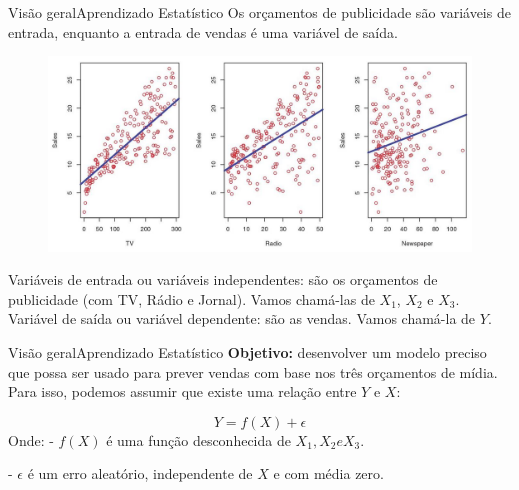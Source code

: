 \documentclass[t]{beamer}
\begin{document}
\begin{ftst}{Visão geral}{{Aprendizado Estatístico}}
\justifying
Os orçamentos de publicidade são variáveis de entrada, enquanto a entrada de vendas é uma variável de saída.

\begin{figure}
    \centering
    \includegraphics[scale=0.7]{Figuras/slide03_04.jpg}
\end{figure}
\small
Variáveis de entrada ou variáveis independentes: são os orçamentos de publicidade (com TV, Rádio e Jornal). Vamos chamá-las de $X_1$, $X_2$ e $X_3$.
\vone
Variável de saída ou variável dependente: são as vendas. Vamos chamá-la de $Y$.
\end{ftst}


\begin{ftst}{Visão geral}{{Aprendizado Estatístico}}
\justifying
\textbf{Objetivo:} desenvolver um modelo preciso que possa ser usado para prever vendas com base nos três orçamentos de mídia.
\vone
Para isso, podemos assumir que existe uma relação entre $Y$ e $X$:

\vone
\begin{equation}
    Y = f(X) + \epsilon
\end{equation}
\vone
Onde:
\vone
- $f(X)$ é uma função desconhecida de $X_1, X_2 e X_3$.

- $\epsilon$ é um erro aleatório, independente de $X$ e com média zero.
\end{ftst}

\end{document}
